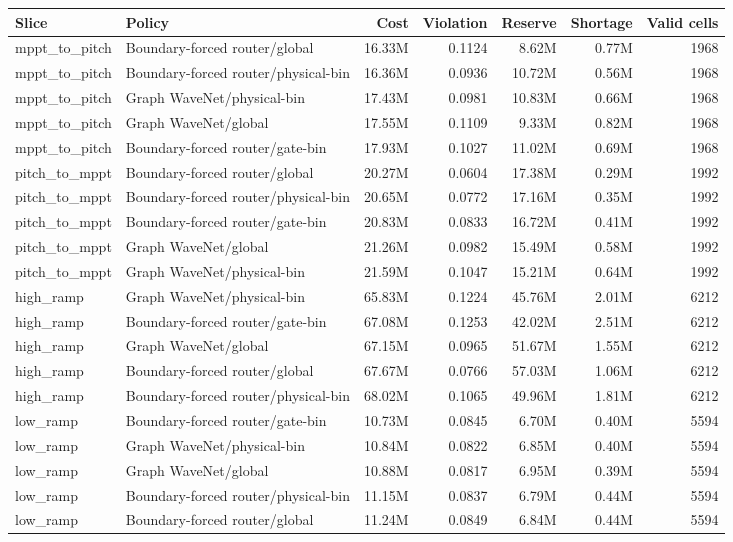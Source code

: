 \begin{tabular}{llrrrrr}
\toprule
Slice & Policy & Cost & Violation & Reserve & Shortage & Valid cells \\
\midrule
mppt\_to\_pitch & Boundary-forced router/global & 16.33M & 0.1124 & 8.62M & 0.77M & 1968 \\
mppt\_to\_pitch & Boundary-forced router/physical-bin & 16.36M & 0.0936 & 10.72M & 0.56M & 1968 \\
mppt\_to\_pitch & Graph WaveNet/physical-bin & 17.43M & 0.0981 & 10.83M & 0.66M & 1968 \\
mppt\_to\_pitch & Graph WaveNet/global & 17.55M & 0.1109 & 9.33M & 0.82M & 1968 \\
mppt\_to\_pitch & Boundary-forced router/gate-bin & 17.93M & 0.1027 & 11.02M & 0.69M & 1968 \\
pitch\_to\_mppt & Boundary-forced router/global & 20.27M & 0.0604 & 17.38M & 0.29M & 1992 \\
pitch\_to\_mppt & Boundary-forced router/physical-bin & 20.65M & 0.0772 & 17.16M & 0.35M & 1992 \\
pitch\_to\_mppt & Boundary-forced router/gate-bin & 20.83M & 0.0833 & 16.72M & 0.41M & 1992 \\
pitch\_to\_mppt & Graph WaveNet/global & 21.26M & 0.0982 & 15.49M & 0.58M & 1992 \\
pitch\_to\_mppt & Graph WaveNet/physical-bin & 21.59M & 0.1047 & 15.21M & 0.64M & 1992 \\
high\_ramp & Graph WaveNet/physical-bin & 65.83M & 0.1224 & 45.76M & 2.01M & 6212 \\
high\_ramp & Boundary-forced router/gate-bin & 67.08M & 0.1253 & 42.02M & 2.51M & 6212 \\
high\_ramp & Graph WaveNet/global & 67.15M & 0.0965 & 51.67M & 1.55M & 6212 \\
high\_ramp & Boundary-forced router/global & 67.67M & 0.0766 & 57.03M & 1.06M & 6212 \\
high\_ramp & Boundary-forced router/physical-bin & 68.02M & 0.1065 & 49.96M & 1.81M & 6212 \\
low\_ramp & Boundary-forced router/gate-bin & 10.73M & 0.0845 & 6.70M & 0.40M & 5594 \\
low\_ramp & Graph WaveNet/physical-bin & 10.84M & 0.0822 & 6.85M & 0.40M & 5594 \\
low\_ramp & Graph WaveNet/global & 10.88M & 0.0817 & 6.95M & 0.39M & 5594 \\
low\_ramp & Boundary-forced router/physical-bin & 11.15M & 0.0837 & 6.79M & 0.44M & 5594 \\
low\_ramp & Boundary-forced router/global & 11.24M & 0.0849 & 6.84M & 0.44M & 5594 \\
\bottomrule
\end{tabular}

